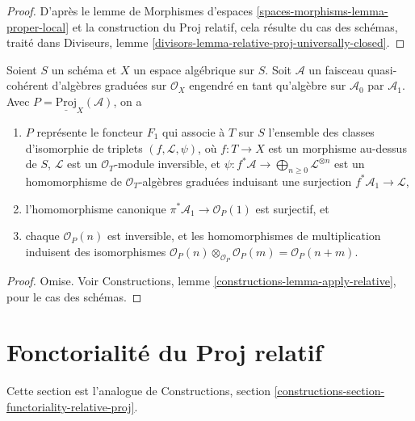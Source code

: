\begin{proof}
D'après le lemme de Morphismes d'espaces
\ref{spaces-morphisms-lemma-proper-local}
et la construction du Proj relatif, cela résulte du
cas des schémas, traité dans
Diviseurs, lemme \ref{divisors-lemma-relative-proj-universally-closed}.
\end{proof}

\begin{lemma}
\label{lemma-relative-proj-generated-in-degree-1}
Soient $S$ un schéma et $X$ un espace algébrique sur $S$.
Soit $\mathcal{A}$ un faisceau quasi-cohérent d'algèbres graduées sur $\mathcal{O}_X$
engendré en tant qu'algèbre sur $\mathcal{A}_0$ par $\mathcal{A}_1$.
Avec $P = \underline{\text{Proj}}_X(\mathcal{A})$, on a
\begin{enumerate}
\item $P$ représente le foncteur $F_1$ qui associe à
$T$ sur $S$ l'ensemble des classes d'isomorphie de
triplets $(f, \mathcal{L}, \psi)$, où $f : T \to X$ est un morphisme
au-dessus de $S$, $\mathcal{L}$ est un $\mathcal{O}_T$-module inversible, et
$\psi : f^*\mathcal{A} \to \bigoplus_{n \geq 0} \mathcal{L}^{\otimes n}$
est un homomorphisme de $\mathcal{O}_T$-algèbres graduées induisant une surjection
$f^*\mathcal{A}_1 \to \mathcal{L}$,
\item l'homomorphisme canonique $\pi^*\mathcal{A}_1 \to \mathcal{O}_P(1)$ est
surjectif, et
\item chaque $\mathcal{O}_P(n)$ est inversible,
et les homomorphismes de multiplication induisent des isomorphismes
$\mathcal{O}_P(n) \otimes_{\mathcal{O}_P} \mathcal{O}_P(m) =
\mathcal{O}_P(n + m)$.
\end{enumerate}
\end{lemma}

\begin{proof}
Omise.
Voir Constructions, lemme \ref{constructions-lemma-apply-relative},
pour le cas des schémas.
\end{proof}







\section{Fonctorialité du Proj relatif}
\label{section-functoriality-relative-proj}

\noindent
Cette section est l'analogue de
Constructions, section \ref{constructions-section-functoriality-relative-proj}.

